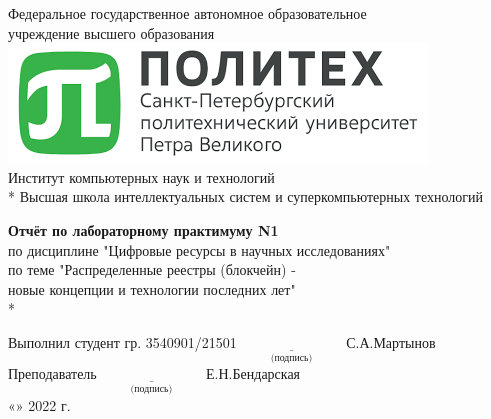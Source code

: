 \begin{titlepage}

\begin{center} %
Федеральное государственное автономное образовательное \\
учреждение высшего образования \\[0.4cm]
\includegraphics[scale=0.8]{res/SPbPU-logo} \\[0.4cm]
Институт компьютерных наук и технологий \\*
Высшая школа интеллектуальных систем и суперкомпьютерных технологий
\end{center}

\vspace{3cm}

\begin{center} %
\textbf{Отчёт по лабораторному практимуму N1}\\
по дисциплине "Цифровые ресурсы в научных исследованиях" \\
по теме "Распределенные реестры (блокчейн) - \\ новые концепции и технологии последних лет" \\*
\end{center}

\vspace{3cm}
 
\begin{flushleft}
Выполнил студент гр. 3540901/21501 \hspace{3cm} $\underset{\text{(подпись)}}{\underline{\hspace{3cm}}}$ С.А.Мартынов\\[0.5cm]
Преподаватель \hspace{7.25cm} $\underset{\text{(подпись)}}{\underline{\hspace{3cm}}}$ Е.Н.Бендарская\\[0.5cm]
\hspace{10.2cm} «\underline{\hspace{1cm}}» \underline{\hspace{3cm}} 2022 г.
\end{flushleft}


\end{titlepage}
